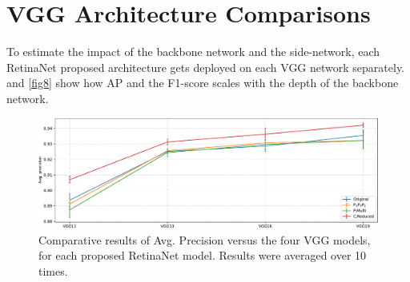 \section{VGG Architecture Comparisons}
To estimate the impact of the backbone network and the side-network, each RetinaNet proposed architecture gets deployed on each VGG network separately.  and \ref{fig8} show how AP and the F1-score scales with the depth of the backbone network.   

\begin{figure}[!htb]
  \centering
  \includegraphics[width=\textwidth]{figures/ch3/fig7.pdf}
  \caption{Comparative results of Avg. Precision versus the four VGG models, for each proposed RetinaNet model. Results were averaged over 10 times.}
  \label{fig7}
\end{figure}

\begin{table}[!htb]
  \centering
  \caption{Indicative values of Avg. Precision for the selected four VGG models, for each proposed RetinaNet model (). Parentheses indicate the input resolution.}
  \label{tab3}
\end{table}

